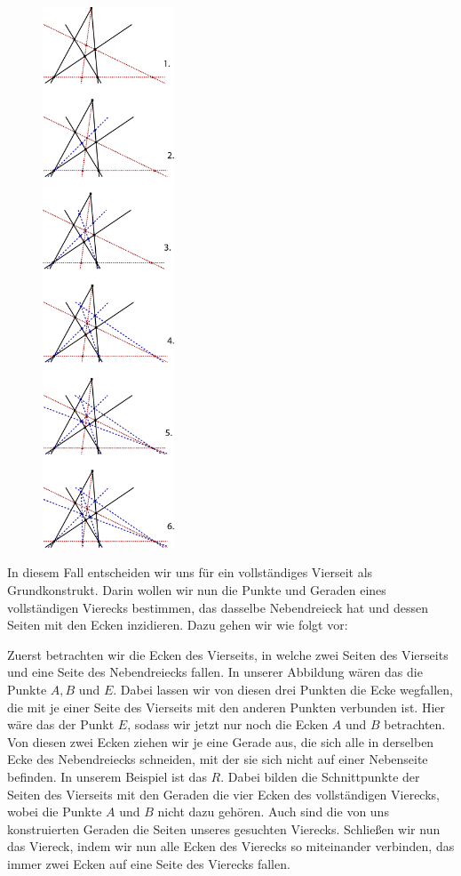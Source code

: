 \documentclass[12pt,a4paper]{article}
\begin{document}
\begin{figure}
\centering
\includegraphics[width=0.35\textwidth]{Bilder/13erKonfigStepbyStep3.png}
\end{figure}

In diesem Fall entscheiden wir uns für ein vollständiges Vierseit als Grundkonstrukt. Darin wollen wir nun die Punkte und Geraden eines vollständigen Vierecks bestimmen, das dasselbe Nebendreieck hat und dessen Seiten mit den Ecken inzidieren. Dazu gehen wir wie folgt vor:

Zuerst betrachten wir die Ecken des Vierseits, in welche zwei Seiten des Vierseits und eine Seite des Nebendreiecks fallen. In unserer Abbildung wären das die Punkte $A, B$ und $E$. Dabei lassen wir von diesen drei Punkten die Ecke wegfallen, die mit je einer Seite des Vierseits mit den anderen Punkten verbunden ist. Hier wäre das der Punkt $E$, sodass wir jetzt nur noch die Ecken $A$ und $B$ betrachten. Von diesen zwei Ecken ziehen wir je eine Gerade aus, die sich alle in derselben Ecke des Nebendreiecks schneiden, mit der sie sich nicht auf einer Nebenseite befinden. In unserem Beispiel ist das $R$. Dabei bilden die Schnittpunkte der Seiten des Vierseits mit den Geraden die vier Ecken des vollständigen Vierecks, wobei die Punkte $A$ und $B$ nicht dazu gehören. Auch sind die von uns konstruierten Geraden die Seiten unseres gesuchten Vierecks. Schließen wir nun das Viereck, indem wir nun alle Ecken des Vierecks so miteinander verbinden, das immer zwei Ecken auf eine Seite des Vierecks fallen.
\end{document}
